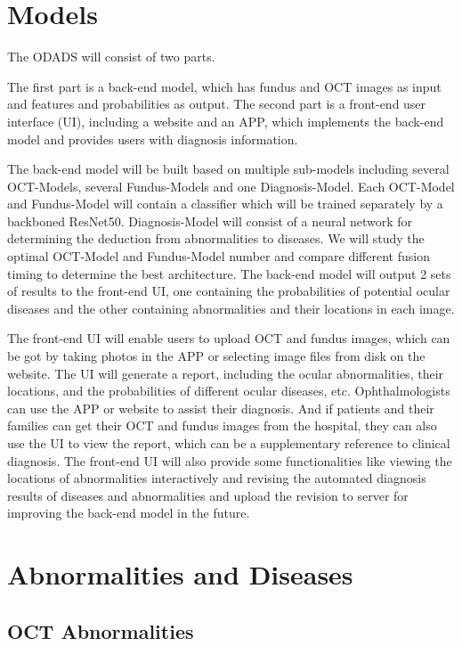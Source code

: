 \documentclass{article}
\begin{document}
	\section{Models}
		
		The ODADS will consist of two parts. 
		
		The first part is a back-end model, which has fundus and OCT images as input and features and probabilities as output. The second part is a front-end user interface (UI), including a website and an APP, which implements the back-end model and provides users with diagnosis information.
		
		The back-end model will be built based on multiple sub-models including several OCT-Models, several Fundus-Models and one Diagnosis-Model.  Each OCT-Model and Fundus-Model will contain a classifier which will be trained separately by a backboned ResNet50.  Diagnosis-Model will consist of a neural network for determining the deduction from abnormalities to diseases.  We will study the optimal OCT-Model and Fundus-Model number and compare different fusion timing to determine the best architecture.  The back-end model will output 2 sets of results to the front-end UI, one containing the probabilities of potential ocular diseases and the other containing abnormalities and their locations in each image.
		
		The front-end UI will enable users to upload OCT and fundus images, which can be got by taking photos in the APP or selecting image files from disk on the website. The UI will generate a report, including the ocular abnormalities, their locations, and the probabilities of different ocular diseases, etc. Ophthalmologists can use the APP or website to assist their diagnosis. And if patients and their families can get their OCT and fundus images from the hospital, they can also use the UI to view the report, which can be a supplementary reference to clinical diagnosis.  The front-end UI will also provide some functionalities like viewing the locations of abnormalities interactively and revising the automated diagnosis results of diseases and abnormalities and upload the revision to server for improving the back-end model in the future.
	
	\pagebreak
	\section{Abnormalities and Diseases} \label{sec:ab_di}
	
	\subsection{OCT Abnormalities}
	
\end{document}
